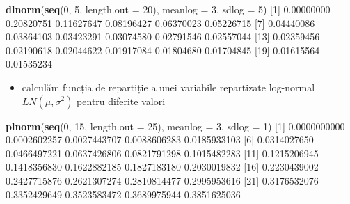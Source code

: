 \documentclass[]{article}
\newenvironment{Shaded}{\begin{snugshade}}{\end{snugshade}}
\newcommand{\KeywordTok}[1]{\textcolor[rgb]{0.13,0.29,0.53}{\textbf{#1}}}
\newcommand{\DataTypeTok}[1]{\textcolor[rgb]{0.13,0.29,0.53}{#1}}
\newcommand{\DecValTok}[1]{\textcolor[rgb]{0.00,0.00,0.81}{#1}}
\newcommand{\FloatTok}[1]{\textcolor[rgb]{0.00,0.00,0.81}{#1}}
\newcommand{\NormalTok}[1]{#1}
\providecommand{\tightlist}{%
  \setlength{\itemsep}{0pt}\setlength{\parskip}{0pt}}
\begin{document}
\begin{Shaded}
\begin{Highlighting}[]
\KeywordTok{dlnorm}\NormalTok{(}\KeywordTok{seq}\NormalTok{(}\DecValTok{0}\NormalTok{, }\DecValTok{5}\NormalTok{, }\DataTypeTok{length.out =} \DecValTok{20}\NormalTok{), }\DataTypeTok{meanlog =} \DecValTok{3}\NormalTok{, }\DataTypeTok{sdlog =} \DecValTok{5}\NormalTok{)}
\NormalTok{ [}\DecValTok{1}\NormalTok{] }\FloatTok{0.00000000} \FloatTok{0.20820751} \FloatTok{0.11627647} \FloatTok{0.08196427} \FloatTok{0.06370023} \FloatTok{0.05226715}
\NormalTok{ [}\DecValTok{7}\NormalTok{] }\FloatTok{0.04440086} \FloatTok{0.03864103} \FloatTok{0.03423291} \FloatTok{0.03074580} \FloatTok{0.02791546} \FloatTok{0.02557044}
\NormalTok{[}\DecValTok{13}\NormalTok{] }\FloatTok{0.02359456} \FloatTok{0.02190618} \FloatTok{0.02044622} \FloatTok{0.01917084} \FloatTok{0.01804680} \FloatTok{0.01704845}
\NormalTok{[}\DecValTok{19}\NormalTok{] }\FloatTok{0.01615564} \FloatTok{0.01535234}
\end{Highlighting}
\end{Shaded}

\begin{itemize}
\tightlist
\item
  calculăm funcția de repartiție a unei variabile repartizate log-normal
  \(LN(\mu, \sigma^2)\) pentru diferite valori
\end{itemize}

\begin{Shaded}
\begin{Highlighting}[]
\KeywordTok{plnorm}\NormalTok{(}\KeywordTok{seq}\NormalTok{(}\DecValTok{0}\NormalTok{, }\DecValTok{15}\NormalTok{, }\DataTypeTok{length.out =} \DecValTok{25}\NormalTok{), }\DataTypeTok{meanlog =} \DecValTok{3}\NormalTok{, }\DataTypeTok{sdlog =} \DecValTok{1}\NormalTok{)}
\NormalTok{ [}\DecValTok{1}\NormalTok{] }\FloatTok{0.0000000000} \FloatTok{0.0002602257} \FloatTok{0.0027443707} \FloatTok{0.0088606283} \FloatTok{0.0185933103}
\NormalTok{ [}\DecValTok{6}\NormalTok{] }\FloatTok{0.0314027650} \FloatTok{0.0466497221} \FloatTok{0.0637426806} \FloatTok{0.0821791298} \FloatTok{0.1015482283}
\NormalTok{[}\DecValTok{11}\NormalTok{] }\FloatTok{0.1215206945} \FloatTok{0.1418356830} \FloatTok{0.1622882185} \FloatTok{0.1827183180} \FloatTok{0.2030019832}
\NormalTok{[}\DecValTok{16}\NormalTok{] }\FloatTok{0.2230439002} \FloatTok{0.2427715876} \FloatTok{0.2621307274} \FloatTok{0.2810814477} \FloatTok{0.2995953616}
\NormalTok{[}\DecValTok{21}\NormalTok{] }\FloatTok{0.3176532076} \FloatTok{0.3352429649} \FloatTok{0.3523583472} \FloatTok{0.3689975944} \FloatTok{0.3851625036}
\end{Highlighting}
\end{Shaded}
\end{document}
